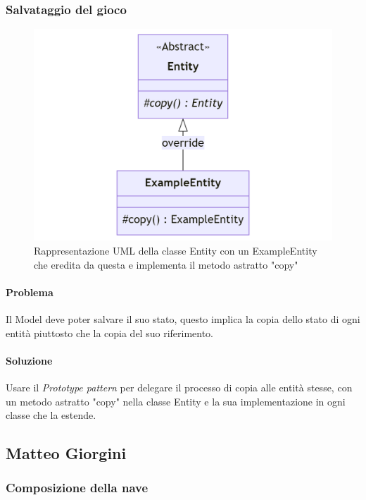 \documentclass[a4paper,12pt]{report}
\begin{document}
\subsubsection*{Salvataggio del gioco}
\begin{figure}[H]
	\centering{}
	\includegraphics[width=\textwidth]{img/Prototype.png}
	\caption{Rappresentazione UML della classe Entity con un ExampleEntity che eredita da questa e implementa il metodo astratto "copy"}
	\label{img:Prototype}
\end{figure}
\paragraph{Problema} Il Model deve poter salvare il suo stato, questo implica la copia dello stato di ogni entità piuttosto che la copia del suo riferimento.
\paragraph{Soluzione} Usare il \textit{Prototype pattern} per delegare il processo di copia alle entità stesse, con un metodo astratto "copy" nella classe Entity e la sua implementazione in ogni classe che la estende.

\subsection*{Matteo Giorgini}
\subsubsection*{Composizione della nave}
\end{document}
